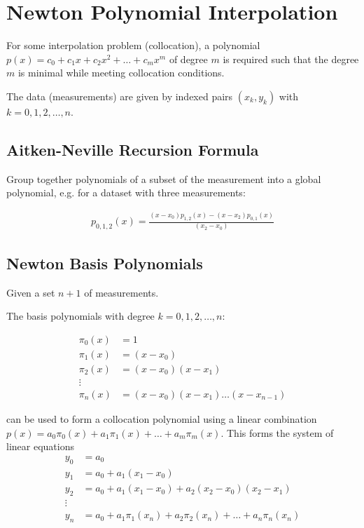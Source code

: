 \section{Newton Polynomial Interpolation}

For some interpolation problem (collocation), a polynomial
$p(x) = c_0 + c_1x + c_2x^2 + \ldots + c_mx^m$
of degree $m$ is required such that the degree $m$ is minimal while meeting collocation conditions.

The data (measurements) are given by indexed pairs $(x_k,y_k)$ with $k=0,1,2,\ldots,n$.

\subsection{Aitken-Neville Recursion Formula}

Group together polynomials of a subset of the measurement into a global polynomial, e.g. for a dataset with three measurements:

\begin{align*}
    p_{0,1,2}(x)=\frac{(x-x_0)p_{1,2}(x) - (x-x_2)p_{0,1}(x)}{(x_2-x_0)}
\end{align*}

\subsection{Newton Basis Polynomials}
Given a set $n+1$ of measurements.

The basis polynomials with degree $k=0,1,2,\ldots,n$:

\begin{snugshade*}
    \begin{align*}
        \pi_0(x) & = 1 \\
        \pi_1(x) & = (x-x_0) \\
        \pi_2(x) & = (x-x_0)(x-x_1) \\
        \vdots \\
        \pi_n(x) & = (x-x_0)(x-x_1)\ldots(x-x_{n-1})
    \end{align*}
\end{snugshade*}

can be used to form a collocation polynomial using a linear combination
$p(x)=a_0\pi_0(x) + a_1\pi_1(x) + \ldots + a_m\pi_m(x)$.
This forms the system of linear equations
\begin{align*}
    y_0 & = a_0 \\
    y_1 & = a_0 + a_1(x_1-x_0) \\
    y_2 & = a_0 + a_1(x_1-x_0) + a_2(x_2-x_0)(x_2-x_1) \\
    \vdots \\
    y_n & = a_0+a_1\pi_1(x_n)+a_2\pi_2(x_n)+\ldots+a_n\pi_n(x_n)
\end{align*}

